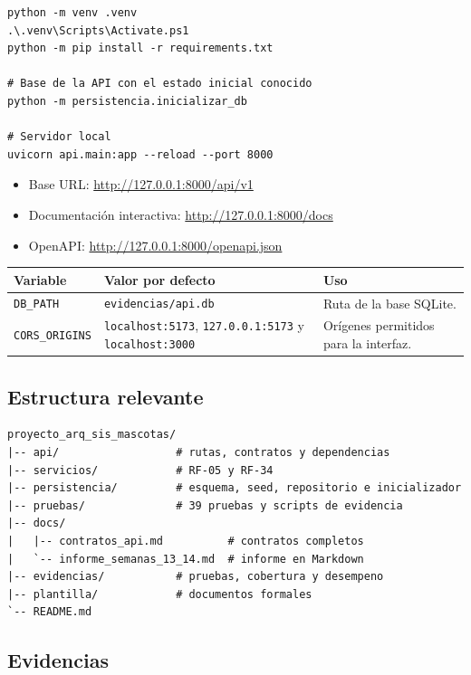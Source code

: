 \documentclass[11pt,a4paper]{article}
\newcommand{\code}[1]{\texttt{#1}}
\newcommand{\thead}[1]{\textbf{#1}}
\begin{document}
\begin{lstlisting}
python -m venv .venv
.\.venv\Scripts\Activate.ps1
python -m pip install -r requirements.txt

# Base de la API con el estado inicial conocido
python -m persistencia.inicializar_db

# Servidor local
uvicorn api.main:app --reload --port 8000
\end{lstlisting}

\begin{itemize}
\item Base URL: \url{http://127.0.0.1:8000/api/v1}
\item Documentación interactiva: \url{http://127.0.0.1:8000/docs}
\item OpenAPI: \url{http://127.0.0.1:8000/openapi.json}
\end{itemize}

{\footnotesize
\begin{tabularx}{\linewidth}{@{}V{0.6}V{1.1}V{1.3}@{}}
\toprule
\thead{Variable} & \thead{Valor por defecto} & \thead{Uso} \\ \midrule
\code{DB\_PATH} & \code{evidencias/api.db} & Ruta de la base SQLite. \\
\code{CORS\_ORIGINS} & \code{localhost:5173}, \code{127.0.0.1:5173} y
\code{localhost:3000} & Orígenes permitidos para la interfaz. \\
\bottomrule
\end{tabularx}
}

\subsection{Estructura relevante}

\begin{lstlisting}
proyecto_arq_sis_mascotas/
|-- api/                  # rutas, contratos y dependencias
|-- servicios/            # RF-05 y RF-34
|-- persistencia/         # esquema, seed, repositorio e inicializador
|-- pruebas/              # 39 pruebas y scripts de evidencia
|-- docs/
|   |-- contratos_api.md          # contratos completos
|   `-- informe_semanas_13_14.md  # informe en Markdown
|-- evidencias/           # pruebas, cobertura y desempeno
|-- plantilla/            # documentos formales
`-- README.md
\end{lstlisting}

\subsection{Evidencias}
\end{document}
